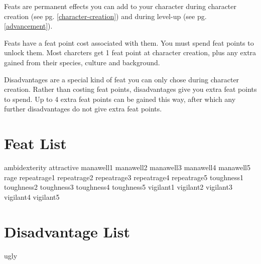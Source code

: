 \begin{multicols*}{2}
    Feats are permanent effects you can add to your character during character
    creation (see pg. \ref{character-creation}) and during level-up (see pg.
    \ref{advancement}).

    Feats have a feat point cost associated with them. You must spend feat
    points to unlock them. Most charcters get 1 feat point at character
    creation, plus any extra gained from their species, culture and background.

    Disadvantages are a special kind of feat you can only chose during
    character creation. Rather than costing feat points, disadvantages give you
    extra feat points to spend. Up to 4 extra feat points can be gained this
    way, after which any further disadvantages do not give extra feat points.

    \section{Feat List}
    {ambidexterity}
    {attractive}
    {manawell1}
    {manawell2}
    {manawell3}
    {manawell4}
    {manawell5}
    {rage}
    {repeatrage1}
    {repeatrage2}
    {repeatrage3}
    {repeatrage4}
    {repeatrage5}
    {toughness1}
    {toughness2}
    {toughness3}
    {toughness4}
    {toughness5}
    {vigilant1}
    {vigilant2}
    {vigilant3}
    {vigilant4}
    {vigilant5}

    \section{Disadvantage List}
    {ugly}

\end{multicols*}
